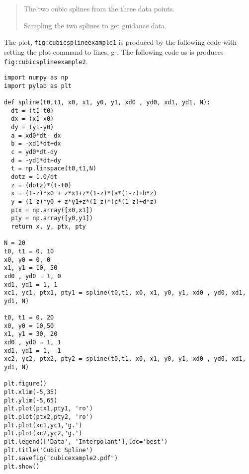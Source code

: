 \begin{quote}
The two cubic splines from the three data points.

Sampling the two splines to get guidance data.
\end{quote}

The plot, \texttt{fig:cubicsplineexample1} is produced by the following
code with setting the plot command to lines, g-. The following code as
is produces \texttt{fig:cubicsplineexample2}.

\begin{verbatim}
import numpy as np
import pylab as plt

def spline(t0,t1, x0, x1, y0, y1, xd0 , yd0, xd1, yd1, N):
  dt = (t1-t0)
  dx = (x1-x0)
  dy = (y1-y0)
  a = xd0*dt- dx
  b = -xd1*dt+dx
  c = yd0*dt-dy
  d = -yd1*dt+dy
  t = np.linspace(t0,t1,N)
  dotz = 1.0/dt
  z = (dotz)*(t-t0)
  x = (1-z)*x0 + z*x1+z*(1-z)*(a*(1-z)+b*z)
  y = (1-z)*y0 + z*y1+z*(1-z)*(c*(1-z)+d*z)
  ptx = np.array([x0,x1])
  pty = np.array([y0,y1])
  return x, y, ptx, pty

N = 20
t0, t1 = 0, 10
x0, y0 = 0, 0
x1, y1 = 10, 50
xd0 , yd0 = 1, 0
xd1, yd1 = 1, 1
xc1, yc1, ptx1, pty1 = spline(t0,t1, x0, x1, y0, y1, xd0 , yd0, xd1, yd1, N)

t0, t1 = 0, 20
x0, y0 = 10,50
x1, y1 = 30, 20
xd0 , yd0 = 1, 1
xd1, yd1 = 1, -1
xc2, yc2, ptx2, pty2 = spline(t0,t1, x0, x1, y0, y1, xd0 , yd0, xd1, yd1, N)

plt.figure()
plt.xlim(-5,35)
plt.ylim(-5,65)
plt.plot(ptx1,pty1, 'ro')
plt.plot(ptx2,pty2, 'ro')
plt.plot(xc1,yc1,'g.')
plt.plot(xc2,yc2,'g.')
plt.legend(['Data', 'Interpolant'],loc='best')
plt.title('Cubic Spline')
plt.savefig("cubicexample2.pdf")
plt.show()
\end{verbatim}
